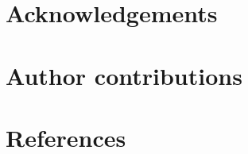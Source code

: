 \documentclass[9pt, twocolumn, lineno]{templates/pi/pi-article}
\begin{document}




\section*{Acknowledgements}


\section*{Author contributions}




\section*{References}


\end{document}
